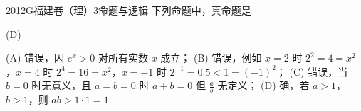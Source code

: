 
\begin{problem}{2012}{G}{福建卷（理）}{3}{命题与逻辑}
下列命题中，真命题是
\begin{choices}
\end{choices}
\end{problem}

\begin{answer}
(D)
\end{answer}

\begin{solutions}
(A) 错误，因 $ e^x > 0 $ 对所有实数 $ x $ 成立；  
(B) 错误，例如 $ x = 2 $ 时 $ 2^2 = 4 = x^2 $，$ x = 4 $ 时 $ 2^4 = 16 = x^2 $，$ x = -1 $ 时 $ 2^{-1} = 0.5 < 1 = (-1)^2 $；  
(C) 错误，当 $ b = 0 $ 时无意义，且 $ a = b = 0 $ 时 $ a + b = 0 $ 但 $ \frac{a}{b} $ 无定义；  
(D) 确，若 $ a > 1 $，$ b > 1 $，则 $ ab > 1 \cdot 1 = 1 $.
\end{solutions}